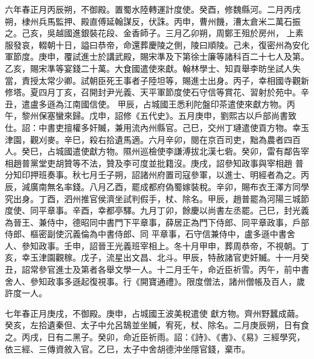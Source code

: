 \begin{pinyinscope}
 六年春正月丙辰朔，不御殿。置蜀水陸轉運計度使。癸酉，修魏縣河。二月丙戌朔，棣州兵馬監押、殿直傅延翰謀反，伏誅。丙申，曹州饑，漕太倉米二萬石振之。己亥，吳越國進銀裝花段、金香師子。三月乙卯朔，周鄭王殂於房州，
 上素服發哀，輟朝十日，謚曰恭帝，命還葬慶陵之側，陵曰順陵。己未，復密州為安化軍節度。庚申，覆試進士於講武殿，賜宋準及下第徐士廉等諸科百二十七人及第。乙亥，賜宋準等宴錢二十萬。大食國遣使來獻。翰林學士、知貢舉李昉坐試人失當，責授太常少卿。試朝臣死王事者子陸坦等，賜進士出身。丙子，幸相國寺觀新修塔。夏四月丁亥，召開封尹光義、天平軍節度使石守信等賞花、習射於苑中。辛丑，遣盧多遜為江南國信使。
 甲辰，占城國王悉利陀盤印茶遣使來獻方物。丙午，黎州保塞蠻來歸。戊申，詔修《五代史》。五月庚申，劉熙古以戶部尚書致仕。詔：中書吏擅權多奸贓，兼用流內州縣官。己巳，交州丁璉遣使貢方物。幸玉津園，觀刈麥。辛巳，殺右拾遺馬適。六月辛卯，閱在京百司吏，黜為農者四百人。癸巳，占城國遣使獻方物。隰州巡檢使李謙溥拔北漢七砦。癸卯，雷有鄰告宰相趙普黨堂吏胡贊等不法，贊及李可度並批籍沒。庚戌，詔參知政事與宰相趙
 普分知印押班奏事。秋七月壬子朔，詔諸州府置司寇參軍，以進士、明經者為之。丙辰，減廣南無名率錢。八月乙酉，罷成都府偽蜀嫁裝稅。辛卯，賜布衣王澤方同學究出身。丁酉，泗州推官侯濟坐試判假手，杖、除名。甲辰，趙普罷為河陽三城節度使、同平章事。辛酉，幸都亭驛。九月丁卯，餘慶以尚書左丞罷。己巳，封光義為晉王、兼侍中，德昭同中書門下平章事，薛居正為門下侍郎、同平章政事，戶部侍郎、樞密副使沉義倫為中書侍郎、同
 平章事，石守信兼侍中，盧多遜中書舍人、參知政事。壬申，詔晉王光義班宰相上。冬十月甲申，葬周恭帝，不視朝。丁亥，幸玉津園觀稼。戊子，流星出文昌、北斗。甲辰，特赦諸官吏奸贓。十一月癸丑，詔常參官進士及第者各舉文學一人。十二月壬午，命近臣祈雪。丙午，前中書舍人、參知政事多遜起復視事。行《開寶通禮》。限度僧法，諸州僧帳及百人，歲許度一人。



 七年春正月庚戌，不御殿。庚申，占城國王波美稅遣使
 獻方物。齊州野蠶成繭。癸亥，左拾遺秦但、太子中允呂鵠並坐贓，宥死，杖、除名。二月庚辰朔，日有食之。丙戌，日有二黑子。癸卯，命近臣祈雨。詔：《詩》、《書》、《易》三經學究，依三經、三傳資敘入官。乙巳，太子中舍胡德沖坐隱官錢，棄市。




\end{pinyinscope}
